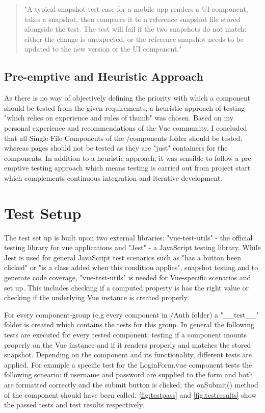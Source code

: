 \begin{quotation}
"A typical snapshot test case for a mobile app renders a UI component, takes a snapshot, then compares it to a reference snapshot file stored alongside the test. The test will fail if the two snapshots do not match: either the change is unexpected, or the reference snapshot needs to be updated to the new version of the UI component."
\end{quotation}

\subsection{Pre-emptive and Heuristic Approach} \label{preheur}
As there is no way of objectively defining the priority with which a component should be tested from the given requirements, a heuristic approach of testing "which relies on experience and rules of thumb" \cite{spillner2014software} was chosen. Based on my personal experience and recommendations of the Vue community, I concluded that all Single File Components of the /components folder should be tested, whereas pages should not be tested as they are "just" containers for the components. In addition to a heuristic approach, it was sensible to follow a pre-emptive testing approach which means testing is carried out from project start \cite{spillner2014software} which complements continuous integration and iterative development.

\section{Test Setup}
The test set up is built upon two external libraries: "vue-test-utils" - the official testing library for vue applications and "Jest" - a JavaScript testing library. While Jest is used for general JavaScript test scenarios such as "has a button been clicked" or "is a class added when this condition applies", snapshot testing and to generate code coverage, "vue-test-utils" is needed for Vue-specific scenarios and set up. This includes checking if a computed property is has the right value or checking if the underlying Vue instance is created properly.

For every component-group (e.g every component in /Auth folder) a "\_\_test\_\_" folder is created which contains the tests for this group. In general the following tests are executed for every tested component: testing if a component mounts properly on the Vue instance and if it renders properly and matches the stored snapshot. Depending on the component and its functionality, different tests are applied. For example a specific test for the LoginForm.vue component tests the following scneario: if username and password are supplied to the form and both are formatted correctly and the submit button is clicked, the onSubmit() method of the component should have been called. \autoref{fig:testpass} and \autoref{fig:testresults} show the passed tests and test results respectively.


